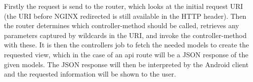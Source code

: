 Firstly the request is send to the router, which looks at the initial request URI (the URI before NGINX redirected is still available in the HTTP header). Then the router determines which controller-method should be called, retrieves any parameters captured by wildcards in the URI, and invoke the controller-method with these. It is then the controllers job to fetch the needed models to create the requested view, which in the case of an api route will be a JSON response of the given models. The JSON response will then be interpreted by the Android client and the requested information will be shown to the user. 
